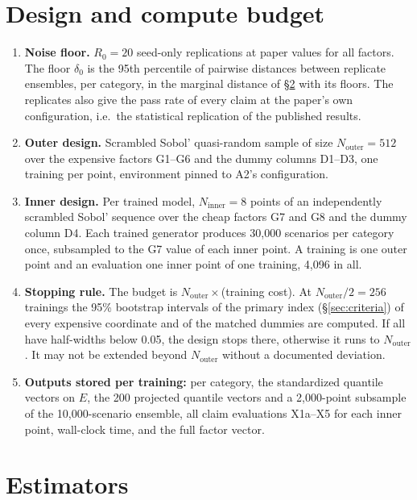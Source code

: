 \documentclass[11pt,a4paper]{article}
\begin{document}
\section{Design and compute budget}\label{sec:design}
\begin{enumerate}[nosep]
\item \textbf{Noise floor.} $R_{0}=20$ seed-only replications at paper
  values for all factors. The floor $\delta_{0}$ is the 95th percentile of
  pairwise distances between replicate ensembles, per category, in
  the marginal distance of \S\ref{sec:estimators} with its floors. The
  replicates also give the pass rate of every claim at the paper's own
  configuration, i.e.\ the statistical replication of the published
  results.
\item \textbf{Outer design.} Scrambled Sobol' quasi-random sample of
  size $N_{\mathrm{outer}}=512$ over the expensive factors G1--G6
  and the dummy columns D1--D3, one training per point, environment
  pinned to A2's configuration.
\item \textbf{Inner design.} Per trained model, $N_{\mathrm{inner}}=8$
  points of an independently scrambled Sobol' sequence over the cheap
  factors G7 and G8 and the dummy column D4. Each trained generator
  produces 30{,}000 scenarios per category once, subsampled to the G7
  value of each inner point. A training is one outer point and an
  evaluation one inner point of one training, 4{,}096 in all.
\item \textbf{Stopping rule.} The budget is
  $N_{\mathrm{outer}}\times$(training cost). At
  $N_{\mathrm{outer}}/2=256$ trainings the 95\% bootstrap intervals of the
  primary index (\S\ref{sec:criteria}) of every expensive coordinate and of
  the matched dummies are computed. If all have half-widths below 0.05,
  the design stops there, otherwise it runs to $N_{\mathrm{outer}}$. It
  may not be extended beyond $N_{\mathrm{outer}}$ without a documented
  deviation.
\item \textbf{Outputs stored per training:} per category, the standardized
  quantile vectors on $E$, the 200 projected quantile vectors and a
  2{,}000-point subsample of the 10{,}000-scenario ensemble, all claim
  evaluations X1a--X5 for each inner point, wall-clock time, and the
  full factor vector.
\end{enumerate}

\section{Estimators}\label{sec:estimators}
\end{document}
